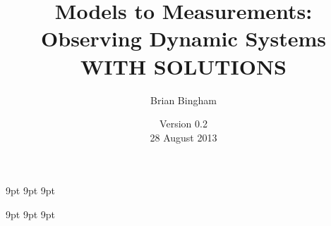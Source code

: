 \documentclass[11pt]{book}
\begin{document}
\newif\ifsolutions
\solutionstrue  %

\graphicspath{{./}{../figs/}}

%

\newcommand{\bmcode}{\begin{lstlisting}[style=myMatStyle]}
\newcommand{\emcode}{\end{lstlisting}}

\newcommand{\SF}{0.2}
\newcommand{\SFb}{0.3}

\newcommand{\FigWidth}{0.7}
\newcommand{\ThisFigWidth}{0.7}

\newcommand{\scaleOneTwo}[2] {\scalebox{#2}}

\graphicspath{{../figs/}}


     {9pt}%
     {9pt}%
     {\itshape}%
     {}%
     {\bfseries}%
     {}%
     {9pt}%
     {}%


\theoremstyle{myex}
\newtheorem{ex}{Exercise}[chapter]

     {9pt}%
     {9pt}%
     {\itshape}%
     {}%
     {\bfseries}%
     {}%
     {9pt}%
     {}%

\theoremstyle{mysoln}
\newtheorem*{soln}{Solution}

\frontmatter
\ifsolutions
\newcommand{\thetitle}{Models to Measurements: \\Observing Dynamic Systems \\ WITH SOLUTIONS}
\else
\newcommand{\thetitle}{Models to Measurements: \\Observing Dynamic Systems}
\fi
\title{\thetitle}
\author{Brian Bingham}
\date{Version 0.2 \\ 28 August 2013}
\end{document}
